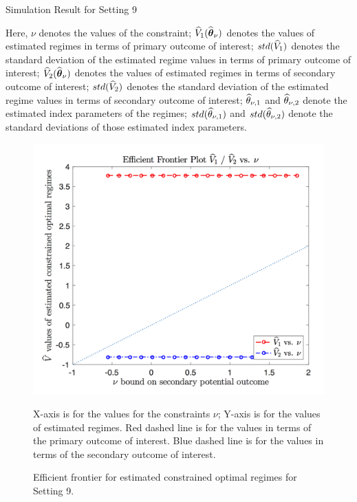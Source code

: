 \begin{table}[!htbp]
	\caption {Simulation Result for Setting 9}
	\centering
	{\tt
		
	}
	\justify
	Here, $\nu$ denotes the values of the constraint; $\widehat{V}_1(\widehat{\boldsymbol{\theta}}_{\nu})$ denotes the values of estimated regimes in terms of primary outcome of interest; $std(\widehat{V}_1)$ denotes the standard deviation of the estimated regime values in terms of primary outcome of interest; $\widehat{V}_2(\widehat{\boldsymbol{\theta}}_{\nu})$ denotes the values of estimated regimes in terms of secondary outcome of interest; $std(\widehat{V}_2)$ denotes the standard deviation of the estimated regime values in terms of secondary outcome of interest; $\widehat{\theta}_{\nu,1}$ and $\widehat{\theta}_{\nu,2}$ denote the estimated index parameters of the regimes; $std(\widehat{\theta}_{\nu,1})$ and $std(\widehat{\theta}_{\nu,2})$ denote the standard deviations of those estimated index parameters.	
\end{table} 
\begin{figure}[!htb]
	\centering
	\includegraphics[width=.9\linewidth]{./Chapter-1/figs/efficient_plot9.png}
	\caption{Efficient frontier for estimated constrained optimal regimes for Setting 9.}
	\label{fig:9}
	\justify
X-axis is for the values for the constraints $\nu$; Y-axis is for the values of estimated regimes. Red dashed line is for the values in terms of the primary outcome of interest. Blue dashed line is for the values in terms of the secondary outcome of interest.
\end{figure}
%	